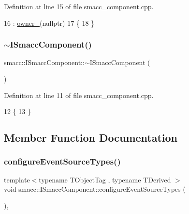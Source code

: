 Definition at line 15 of file smacc\+\_\+component.\+cpp.


\begin{DoxyCode}
16     : \hyperlink{classsmacc_1_1ISmaccComponent_a909590e672450ce0eb0d8facb45c737a}{owner\_}(\textcolor{keyword}{nullptr})
17 \{
18 \}
\end{DoxyCode}
\mbox{\label{classsmacc_1_1ISmaccComponent_a46f5cfc6a308de938b6ee3a5e80a8fe9}} 
\subsubsection{\texorpdfstring{$\sim$\+I\+Smacc\+Component()}{~ISmaccComponent()}}
{\footnotesize\ttfamily smacc\+::\+I\+Smacc\+Component\+::$\sim$\+I\+Smacc\+Component (\begin{DoxyParamCaption}{ }\end{DoxyParamCaption})\hspace{0.3cm}{\ttfamily [virtual]}}



Definition at line 11 of file smacc\+\_\+component.\+cpp.


\begin{DoxyCode}
12 \{
13 \}
\end{DoxyCode}


\subsection{Member Function Documentation}
\mbox{\label{classsmacc_1_1ISmaccComponent_ad1c9ede43be1f83c10c6e7a2e14db8d3}} 
\subsubsection{\texorpdfstring{configure\+Event\+Source\+Types()}{configureEventSourceTypes()}}
{\footnotesize\ttfamily template$<$typename T\+Object\+Tag , typename T\+Derived $>$ \\
void smacc\+::\+I\+Smacc\+Component\+::configure\+Event\+Source\+Types (\begin{DoxyParamCaption}{ }\end{DoxyParamCaption})\hspace{0.3cm}{\ttfamily [inline]}, {\ttfamily [protected]}}



